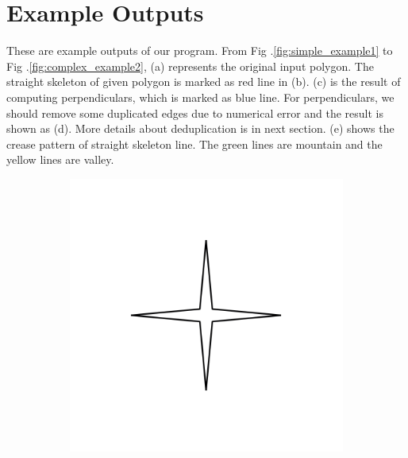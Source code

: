\documentclass[11pt]{article}
\begin{document}
\section{Example Outputs}
These are example outputs of our program. From Fig .\ref{fig:simple_example1} to Fig .\ref{fig:complex_example2}, (a) represents the original input polygon. The straight skeleton of given polygon is marked as red line in (b). (c) is the result of computing perpendiculars, which is marked as blue line. For perpendiculars, we should remove some duplicated edges due to numerical error and the result is shown as (d). More details about deduplication is in next section. (e) shows the crease pattern of straight skeleton line. The green lines are mountain and the yellow lines are valley.
\begin{figure}[H]
\centering
  \begin{subfigure}[b]{0.18\textwidth}
    \includegraphics[width=\textwidth]{FIGS/Part4/s10}
    \caption{}
    \label{fig:s10}
  \end{subfigure}
  \begin{subfigure}[b]{0.18\textwidth}

\end{subfigure}
\end{figure}
\end{document}

